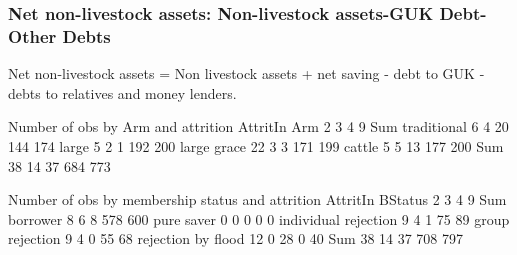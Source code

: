 

\subsubsection{Net non-livestock assets: Non-livestock assets-GUK Debt-Other Debts}

Net non-livestock assets = Non livestock assets + net saving - debt to GUK - debts to relatives and money lenders. 


\begin{Schunk}
\begin{Soutput}


Number of obs by Arm and attrition
             AttritIn
Arm             2   3   4   9 Sum
  traditional   6   4  20 144 174
  large         5   2   1 192 200
  large grace  22   3   3 171 199
  cattle        5   5  13 177 200
  Sum          38  14  37 684 773


Number of obs by membership status and attrition
                      AttritIn
BStatus                  2   3   4   9 Sum
  borrower               8   6   8 578 600
  pure saver             0   0   0   0   0
  individual rejection   9   4   1  75  89
  group rejection        9   4   0  55  68
  rejection by flood    12   0  28   0  40
  Sum                   38  14  37 708 797
\end{Soutput}
\end{Schunk}










